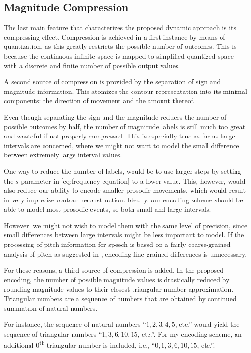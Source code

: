 \subsection{Magnitude Compression}

The last main feature that characterizes the proposed dynamic approach is its compressing effect.
Compression is achieved in a first instance by means of quantization, as this greatly restricts the possible number of outcomes.
This is because the continuous infinite space is mapped to simplified quantized space with a discrete and finite number of possible output values.

A second source of compression is provided by the separation of sign and magnitude information.
This atomizes the contour representation into its minimal components: the direction of movement and the amount thereof.

Even though separating the sign and the magnitude reduces the number of possible outcomes by half, the number of magnitude labels is still much too great and wasteful if not properly compressed.
This is especially true as far as large intervals are concerned, where we might not want to model the small difference between extremely large interval values.

One way to reduce the number of labels, would be to use larger steps by setting the $s$ parameter in \autoref{eq:frequency-equation} to a lower value.
This, however, would also reduce our ability to encode smaller prosodic movements, which would result in very imprecise contour reconstruction.
Ideally, our encoding scheme should be able to model most prosodic events, so both small and large intervals.

However, we might not wish to model them with the same level of precision, since small differences between large intervals might be less important to model.
If the processing of pitch information for speech is based on a fairly coarse-grained analysis of pitch as suggested in \citep{Zatorre2012Musical}, encoding fine-grained differences is unnecessary.

For these reasons, a third source of compression is added.
In the proposed encoding, the number of possible magnitude values is drastically reduced by rounding magnitude values to their closest triangular number approximation.
Triangular numbers are a sequence of numbers that are obtained by continued summation of natural numbers.

For instance, the sequence of natural numbers ``$1, 2, 3, 4, 5$, etc.'' would yield the sequence of triangular numbers ``$1, 3, 6, 10, 15$, etc.''.
For my encoding scheme, an additional 0\textsuperscript{th} triangular number is included, i.e., ``$0, 1, 3, 6, 10, 15$, etc.''.

